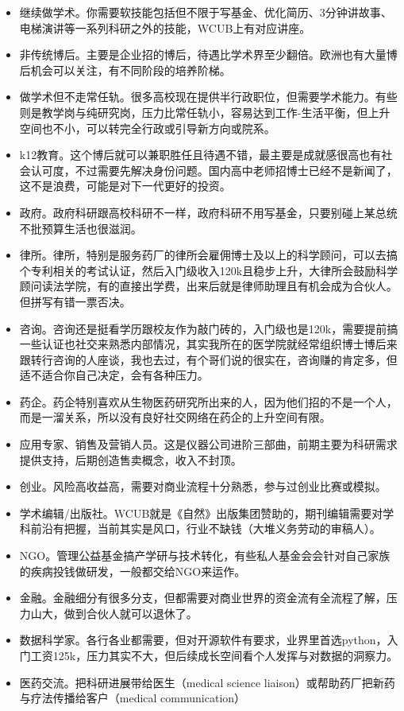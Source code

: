 \documentclass[]{book}
\begin{document}
\begin{itemize}
\item
  继续做学术。你需要软技能包括但不限于写基金、优化简历、3分钟讲故事、电梯演讲等一系列科研之外的技能，WCUB上有对应讲座。
\item
  非传统博后。主要是企业招的博后，待遇比学术界至少翻倍。欧洲也有大量博后机会可以关注，有不同阶段的培养阶梯。
\item
  做学术但不走常任轨。很多高校现在提供半行政职位，但需要学术能力。有些则是教学岗与纯研究岗，压力比常任轨小，容易达到工作-生活平衡，但上升空间也不小，可以转完全行政或引导新方向或院系。
\item
  k12教育。这个博后就可以兼职胜任且待遇不错，最主要是成就感很高也有社会认可度，不过需要先解决身份问题。国内高中老师招博士已经不是新闻了，这不是浪费，可能是对下一代更好的投资。
\item
  政府。政府科研跟高校科研不一样，政府科研不用写基金，只要别碰上某总统不批预算生活也很滋润。
\item
  律所。律所，特别是服务药厂的律所会雇佣博士及以上的科学顾问，可以去搞个专利相关的考试认证，然后入门级收入120k且稳步上升，大律所会鼓励科学顾问读法学院，有的直接出学费，出来后就是律师助理且有机会成为合伙人。但拼写有错一票否决。
\item
  咨询。咨询还是挺看学历跟校友作为敲门砖的，入门级也是120k，需要提前搞一些认证也社交来熟悉内部情况，其实我所在的医学院就经常组织博士博后来跟转行咨询的人座谈，我也去过，有个哥们说的很实在，咨询赚的肯定多，但适不适合你自己决定，会有各种压力。
\item
  药企。药企特别喜欢从生物医药研究所出来的人，因为他们招的不是一个人，而是一溜关系，所以没有良好社交网络在药企的上升空间有限。
\item
  应用专家、销售及营销人员。这是仪器公司进阶三部曲，前期主要为科研需求提供支持，后期创造售卖概念，收入不封顶。
\item
  创业。风险高收益高，需要对商业流程十分熟悉，参与过创业比赛或模拟。
\item
  学术编辑/出版社。WCUB就是《自然》出版集团赞助的，期刊编辑需要对学科前沿有把握，当前其实是风口，行业不缺钱（大堆义务劳动的审稿人）。
\item
  NGO。管理公益基金搞产学研与技术转化，有些私人基金会会针对自己家族的疾病投钱做研发，一般都交给NGO来运作。
\item
  金融。金融细分有很多分支，但都需要对商业世界的资金流有全流程了解，压力山大，做到合伙人就可以退休了。
\item
  数据科学家。各行各业都需要，但对开源软件有要求，业界里首选python，入门工资125k，压力其实不大，但后续成长空间看个人发挥与对数据的洞察力。
\item
  医药交流。把科研进展带给医生（medical science liaison）或帮助药厂把新药与疗法传播给客户（medical communication）
\end{itemize}
\end{document}
